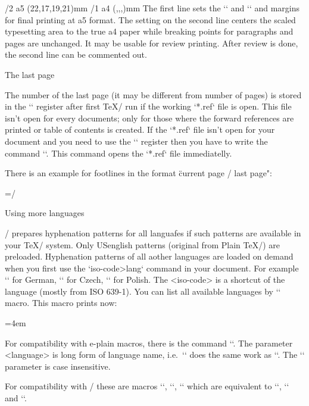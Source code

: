{\begtt
\margins/2 a5 (22,17,19,21)mm
\magscale[1414] \margins/1 a4 (,,,)mm
\endtt
%
The first line sets the `\hsize` and `\vsize` and margins for final
printing at a5 format. The setting on the second line centers the scaled 
typesetting area to the true a4 paper while breaking points for paragraphs
and pages are unchanged. It may be usable for 
review printing. After review is done, the second line can be commented out.


\sec The last page

The number of the last page (it may be different from number of pages) is
stored in the `\lastpage` register after first \TeX/ run if the working `*.ref` 
file is open. This file isn't open for every documents; only for those
where the forward references are printed or table of contents is created.
If the `*.ref` file isn't open for your document and you need to use the
`\lastpage` register then you have to write the command `\openref`. This command opens
the `*.ref` file immediatelly.

There is an example for footlines in the format \"current page / last page": 

\begtt
\footline={\hss \rm \thefontsize[10]\the\pageno/\the\lastpage \hss}
\endtt


\sec Using more languages

\OpTeX/ prepares hyphenation patterns for all languafes if such patterns are
available in your \TeX/ system. 
\new
Only USenglish patterns (original from Plain \TeX/) are preloaded.
Hyphenation patterns of all aother languages are loaded on demand when you first use
the `\<iso-code>lang` command in your document. 
For example `\delang` for German, `\cslang` for
Czech, `\pllang` for Polish. The <iso-code> is a shortcut 
of the language (mostly from ISO 639-1). 
You can list all available languages by `\langlist` 
macro. This macro prints now:

\medskip
{\typosize[9/11.5]\emergencystretch=4em 
\noindent \langlist
\par}
\medskip

\new
For compatibility with e-plain macros, there is the command
``. The parameter <language> is long form of
language name, i.e.\ `` does the same work as `\cslang`.
The `\uselanguage` parameter is case insensitive.

For compatibility with \csplain/ these are macros `\ehyph`, `\chyph`,
`\shyph` which are equivalent to `\enlang`, `\cslang` and `\sklang`.

}
